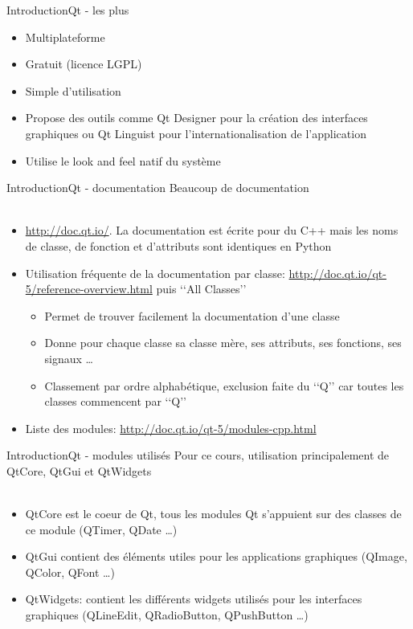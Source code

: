 \documentclass[9pt, french, brown]{beamer}
\newcommand{\mytitle}[1]{{\color{brown}#1 \\~\\}}
\begin{document}
\begin{frame}{Introduction}{Qt - les plus}
\begin{itemize}
\item Multiplateforme
\item Gratuit (licence LGPL)
\item Simple d\rq{}utilisation
\item Propose des outils comme  Qt Designer pour la création des interfaces graphiques ou Qt Linguist pour l\rq{}internationalisation de l\rq{}application
\item Utilise le look and feel natif du système
\end{itemize}
\end{frame}

\begin{frame}{Introduction}{Qt - documentation}
\mytitle{Beaucoup de documentation}
\begin{itemize}
\item \url{http://doc.qt.io/}. La documentation est écrite pour du C++ mais les noms de classe, de fonction et d\rq{}attributs sont identiques en Python
\item Utilisation fréquente de la documentation par classe: \url{http://doc.qt.io/qt-5/reference-overview.html} puis \lq\lq{}All Classes\rq\rq{}
	\begin{itemize}
	\item Permet de trouver facilement la documentation d\rq{}une classe
	\item Donne pour chaque classe sa classe mère, ses attributs, ses fonctions, ses signaux \ldots
	\item Classement par ordre alphabétique, exclusion faite du \lq\lq{}Q\rq\rq{} car toutes les classes commencent par \lq\lq{}Q\rq\rq{}
	\end{itemize}
\item Liste des modules: \url{http://doc.qt.io/qt-5/modules-cpp.html}
 \end{itemize}
\end{frame}

\begin{frame}{Introduction}{Qt - modules utilisés}
\mytitle{Pour ce cours, utilisation principalement de QtCore, QtGui et QtWidgets}
\begin{itemize}
\item QtCore est le coeur de Qt, tous les modules Qt s\rq{}appuient sur des classes de ce module (QTimer, QDate \ldots)
\item QtGui contient des éléments utiles pour les applications graphiques (QImage, QColor, QFont \ldots)
\item QtWidgets: contient les différents widgets utilisés pour les interfaces graphiques (QLineEdit, QRadioButton, QPushButton  \ldots)
\end{itemize}
\end{frame}
\end{document}
